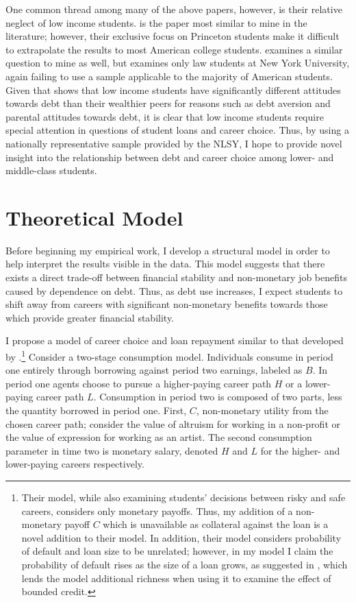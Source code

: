 \documentclass[12pt]{article}
\begin{document}
	One common thread among many of the above papers, however, is their relative neglect of low income students. \textcite{rothstein2011} is the paper most similar to mine in the literature; however, their exclusive focus on Princeton students make it difficult to extrapolate the results to most American college students. \textcite{field2009} examines a similar question to mine as well, but examines only law students at New York University, again failing to use a sample applicable to the majority of American students. Given that \textcite{callender2005} shows that low income students have significantly different attitudes towards debt than their wealthier peers for reasons such as debt aversion and parental attitudes towards debt, it is clear that low income students require special attention in questions of student loans and career choice. Thus, by using a nationally representative sample provided by the NLSY, I hope to provide novel insight into the relationship between debt and career choice among lower- and middle-class students.

	\section{Theoretical Model}
	
	Before beginning my empirical work, I develop a structural model in order to help interpret the results visible in the data. This model suggests that there exists a direct trade-off between financial stability and non-monetary job benefits caused by dependence on debt. Thus, as debt use increases, I expect students to shift away from careers with significant non-monetary benefits towards those which provide greater financial stability.

	I propose a model of career choice and loan repayment similar to that developed by \textcite{abraham2018}.\footnote{Their model, while also examining students' decisions between risky and safe careers, considers only monetary payoffs. Thus, my addition of a non-monetary payoff $C$ which is unavailable as collateral against the loan is a novel addition to their model. In addition, their model considers probability of default and loan size to be unrelated; however, in my model I claim the probability of default rises as the size of a loan grows, as suggested in \textcite{dynarski2015}, which lends the model additional richness when using it to examine the effect of bounded credit.} 
	Consider a two-stage consumption model. Individuals consume in period one entirely through borrowing against period two earnings, labeled as $B$. In period one agents choose to pursue a higher-paying career path $H$ or a lower-paying career path $L$. Consumption in period two is composed of two parts, less the quantity borrowed in period one. First, $C$, non-monetary utility from the chosen career path; consider the value of altruism for working in a non-profit or the value of expression for working as an artist. The second consumption parameter in time two is monetary salary, denoted $H$ and $L$ for the higher- and lower-paying careers respectively.
	
\end{document}
